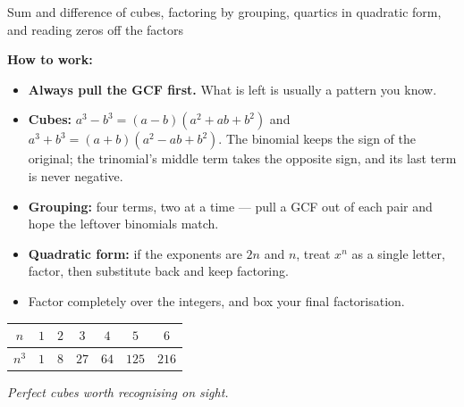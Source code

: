 \documentclass[12pt]{article}
\begin{document}

\begin{center}\small
Sum and difference of cubes, factoring by grouping, quartics in quadratic form, and reading zeros off the factors
\end{center}

\noindent\small\textbf{How to work:}
\begin{itemize}[leftmargin=1cm, itemsep=1pt, topsep=2pt]
  \item \textbf{Always pull the GCF first.} What is left is usually a pattern you know.
  \item \textbf{Cubes:} $a^3 - b^3 = (a-b)(a^2+ab+b^2)$ and $a^3 + b^3 = (a+b)(a^2-ab+b^2)$.
        The binomial keeps the sign of the original; the trinomial's middle term takes
        the opposite sign, and its last term is never negative.
  \item \textbf{Grouping:} four terms, two at a time --- pull a GCF out of each pair and
        hope the leftover binomials match.
  \item \textbf{Quadratic form:} if the exponents are $2n$ and $n$, treat $x^n$ as a
        single letter, factor, then substitute back and keep factoring.
  \item Factor completely over the integers, and box your final factorisation.
\end{itemize}

\begin{center}\small
\begin{tabular}{|c|c|c|c|c|c|c|}
\hline
$n$   & $1$ & $2$ & $3$ & $4$ & $5$ & $6$ \\ \hline
$n^3$ & $1$ & $8$ & $27$ & $64$ & $125$ & $216$ \\ \hline
\end{tabular}\par
\textit{Perfect cubes worth recognising on sight.}
\end{center}
\normalsize



\end{document}
